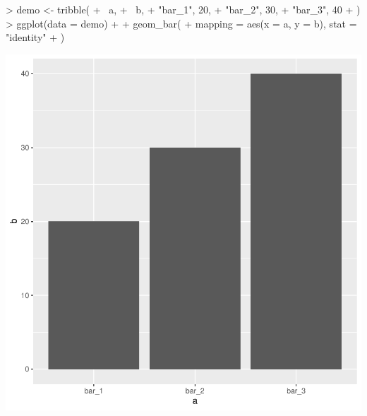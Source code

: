 \documentclass{article}
\begin{document}
\begin{Schunk}
\begin{Sinput}
> demo <- tribble(
+ ~a,
+ ~b,
+ "bar_1", 20,
+ "bar_2", 30,
+ "bar_3", 40
+ )
> ggplot(data = demo) +
+ geom_bar(
+ mapping = aes(x = a, y = b), stat = "identity"
+ )
\end{Sinput}
\end{Schunk}
\includegraphics{tidigg-005}
\end{document}
